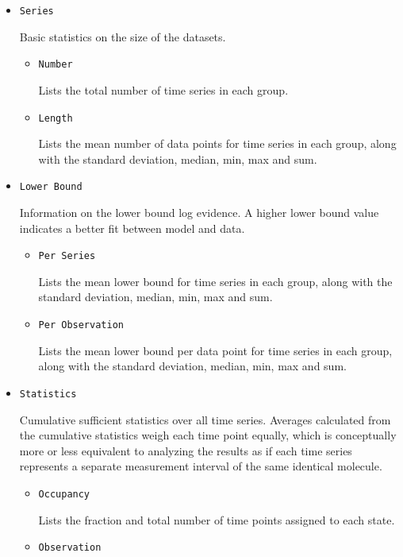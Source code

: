 \documentclass[12pt,article,oldfontcommands]{memoir}
\begin{document}
\begin{itemize}
\item \texttt{Series}

Basic statistics on the size of the datasets.

\begin{itemize}
\item \texttt{Number}

Lists the total number of time series in each group.

\item \texttt{Length}

Lists the mean number of data points for time series in each group, along with the standard deviation, median, min, max and sum. 
\end{itemize}

\item \texttt{Lower Bound}

Information on the lower bound log evidence. A higher lower bound value indicates a better fit between model and data.

\begin{itemize}
\item \texttt{Per Series}

Lists the mean lower bound for time series in each group, along with the standard deviation, median, min, max and sum. 

\item \texttt{Per Observation}

Lists the mean lower bound per data point for time series in each group, along with the standard deviation, median, min, max and sum. 
\end{itemize}

\item \texttt{Statistics}

Cumulative sufficient statistics over all time series.  Averages calculated from the cumulative statistics weigh each time point equally, which is conceptually more or less equivalent to analyzing the results as if each time series represents a separate measurement interval of the same identical molecule. 

\begin{itemize}
\item \texttt{Occupancy}

Lists the fraction and total number of time points assigned to each state.

\item \texttt{Observation}


\end{itemize}
\end{itemize}
\end{document}
